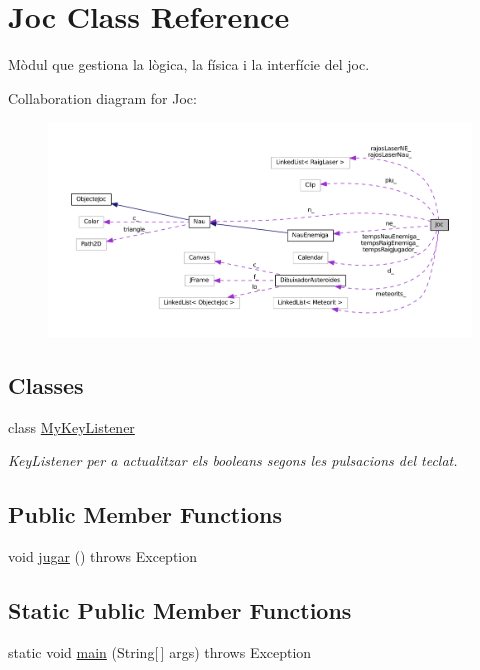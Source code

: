\hypertarget{class_joc}{}\section{Joc Class Reference}
\label{class_joc}


Mòdul que gestiona la lògica, la física i la interfície del joc.  




Collaboration diagram for Joc\+:
\nopagebreak
\begin{figure}[H]
\begin{center}
\leavevmode
\includegraphics[width=350pt]{class_joc__coll__graph}
\end{center}
\end{figure}
\subsection*{Classes}
\begin{DoxyCompactItemize}
\item 
class \hyperlink{class_joc_1_1_my_key_listener}{My\+Key\+Listener}
\begin{DoxyCompactList}\small\item\em Key\+Listener per a actualitzar els booleans segons les pulsacions del teclat. \end{DoxyCompactList}\end{DoxyCompactItemize}
\subsection*{Public Member Functions}
\begin{DoxyCompactItemize}
\item 
void \hyperlink{class_joc_aa5da4464cac2dc81f26430ac16fa7029}{jugar} ()  throws Exception 
\end{DoxyCompactItemize}
\subsection*{Static Public Member Functions}
\begin{DoxyCompactItemize}
\item 
static void \hyperlink{class_joc_a54cbe41c97ce7489f7b0cc62217a7d29}{main} (String\mbox{[}$\,$\mbox{]} args)  throws Exception 
\end{DoxyCompactItemize}
